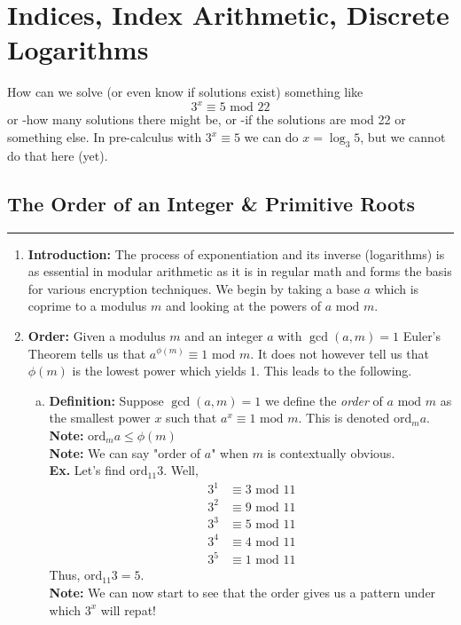 \documentclass[class=article, crop=false]{standalone}
\begin{document}
    
\section{Indices, Index Arithmetic, Discrete Logarithms}
How can we solve (or even know if solutions exist) something like $$3^x \equiv 5\mbox{ mod }22$$
or -how many solutions there might be, or -if the solutions are mod 22 or something else.
In pre-calculus with $3^x \equiv 5$ we can do $x=\log_3 5$, but we cannot do that here (yet).
\subsection{The Order of an Integer \& Primitive Roots}
\rule{\textwidth}{1pt}
\begin{enumerate}
\item \textbf{Introduction:} 
The process of exponentiation and its inverse (logarithms) is as essential in modular arithmetic as it 
is in regular math and forms the basis for various encryption techniques. We begin by taking a base $a$
which is coprime to a modulus $m$ and looking at the powers of $a\mbox{ mod }m$.

\item \textbf{Order:}
Given a modulus $m$ and an integer $a$ with $\gcd(a,m)=1$ Euler's Theorem tells us that
$a^{\phi(m)} \equiv 1\mbox{ mod }m$. It does not however tell us that $\phi(m)$ is the lowest
power which yields 1. This leads to the following.
\begin{enumerate}[(a)]
	\item \textbf{Definition:} Suppose $\gcd(a,m)=1$ we define the \emph{order} of $a\mbox{ mod }m$
	as the smallest power $x$ such that $a^x \equiv 1\mbox{ mod }m$. This is denoted $\mbox{ord}_m a$. \\
	\textbf{Note:} $\mbox{ord}_m a \leq \phi(m)$ \\
	\textbf{Note:} We can say "order of $a$" when $m$ is contextually obvious.\\
	\textbf{Ex.} Let's find $\mbox{ord}_{11} 3$. Well,
	\begin{align*}
		3^1 &\equiv 3\mbox{ mod }11 \\
		3^2 &\equiv 9\mbox{ mod }11 \\
		3^3 &\equiv 5\mbox{ mod }11 \\
		3^4 &\equiv 4\mbox{ mod }11 \\
		3^5 &\equiv 1\mbox{ mod }11
	\end{align*}
	Thus, $\mbox{ord}_{11} 3 = 5$. \\
	\textbf{Note:} We can now start to see that the order gives us a pattern under which
	$3^x$ will repat!
	

\end{enumerate}
\end{enumerate}
\end{document}
